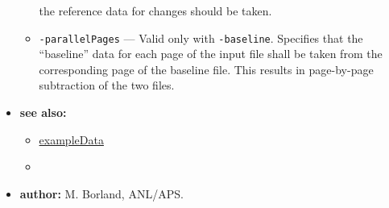 \begin{itemize}
\begin{itemize}
        the reference data for changes should be taken.
    \item {\tt -parallelPages} --- Valid only with {\tt -baseline}.   Specifies that the ``baseline''
        data for each page of the input file shall be taken from the corresponding page of the
        baseline file.  This results in page-by-page subtraction of the two files.
    \end{itemize}
\item {\bf see also:}
    \begin{itemize}
    \item \hyperref{Data for Examples}{Data for Examples (see }{)}{exampleData}
    \item {}
    \end{itemize}
\item {\bf author:} M. Borland, ANL/APS.
\end{itemize}


